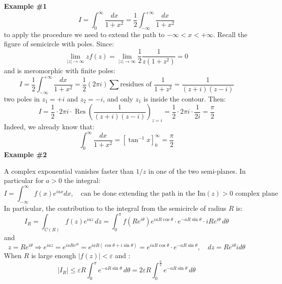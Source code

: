 \documentclass{article}
\begin{document}
\noindent
\textbf{Example \#1}
\begin{equation}
    I = \int_0^{\infty} \frac{dx}{1 + x^2} 
= \frac{1}{2} \int_{-\infty}^{+\infty} \frac{dx}{1 + x^2}
\end{equation}
to apply the procedure we need to extend the path to $-\infty<x<+\infty$. Recall the figure of semicircle with poles. Since:
\begin{equation}
    \lim_{|z| \to \infty} z f(z) = \lim_{|z| \to \infty} \frac12 \frac{1}{z (1 + z^2)} = 0
\end{equation}
and is meromorphic with finite poles:
\begin{equation}
    I = \frac{1}{2} \int_{-\infty}^{+\infty} \frac{dx}{1 + x^2}
= \frac{1}{2}(2\pi i) \sum \text{residues of } \frac{1}{1 + z^2}
= \frac{1}{(z+i)(z-i)}
\end{equation}
two poles in $z_1=+i$ and $z_2=-i$, and only $z_1$ is inside the contour. Then:
\begin{equation}
    I = \frac{1}{2} \cdot 2\pi i \cdot \operatorname{Res} \left( \frac{1}{(z+i)(z-i)} \right)_{z=i}
= \frac{1}{2} \cdot 2\pi i \cdot \frac{1}{2i} = \frac{\pi}{2}
\end{equation}
Indeed, we already know that:
\begin{equation}
    \int_0^\infty \frac{dx}{1+x^2} = [\tan^{-1}x]^{\infty}_0 = \frac{\pi}{2}
\end{equation}
\noindent
\textbf{Example \#2}

\noindent
A complex exponential vanishes faster than $1/z$ in one of the two semi-planes. In particular for $a>0$ the integral:
\begin{equation}
    I =\int_{-\infty}^{\infty} f(x) e^{iax}
 dx, \quad \text{can be done extending the path in the Im$(z)>0$ complex plane}
\end{equation}
In particular, the contribution to the integral from the semicircle of radius $R$ is:
\begin{equation}
    I_R = \int_{C(R)} f(z) e^{iaz} \, dz
= \int_{0}^{\pi} f\left(R e^{i \theta} \right) e^{iaR \cos \theta} \cdot e^{-a R \sin \theta} \cdot i R e^{i \theta} \, d\theta
\end{equation}
and
\begin{equation}
    z = Re^{i\theta} \Rightarrow e^{iaz} = e^{iaRe^{i\theta}} = e^{iaR(\cos\theta + i\sin\theta)} = e^{iaR \cos \theta} \cdot e^{-a R \sin \theta}, \quad dz = Re^{i\theta}id\theta
\end{equation}
When $R$ is large enough $|f(z)|<\varepsilon$ and :
\begin{equation}
    |I_R| \leq \varepsilon R \int_{0}^{\pi} e^{-aR \sin \theta} \, d\theta
= 2 \varepsilon R \int_{0}^{\frac{\pi}{2}} e^{-aR \sin \theta} \, d\theta
\end{equation}
\end{document}

